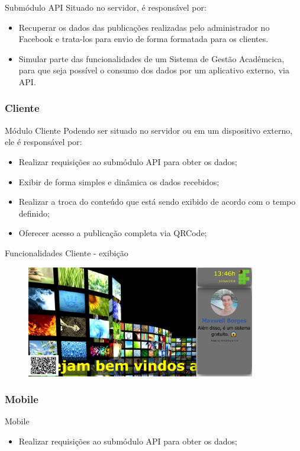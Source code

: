 \documentclass{aula-ifb}
\begin{document}
\begin{frame}{Submódulo API}
Situado no servidor, é responsável por:
\begin{itemize}
   \item Recuperar os dados das publicações realizadas pelo administrador no Facebook e trata-los para envio de forma formatada para os clientes. 
   \item Simular parte das funcionalidades de um Sistema de Gestão Acadêmcica, para que seja possível o consumo dos dados por um aplicativo externo, via API.
\end{itemize}
\end{frame}

\subsubsection{Cliente}
\begin{frame}{Módulo Cliente}
Podendo ser situado no servidor ou em um dispositivo externo, ele é responsável por:
\begin{itemize}
   \item Realizar requisições ao submódulo API para obter os dados;
   \item Exibir de forma simples e dinâmica os dados recebidos;
   \item Realizar a troca do conteúdo que está sendo exibido de acordo com o tempo definido;
   \item Oferecer acesso a publicação completa via QRCode;
\end{itemize}
\end{frame}
\begin{frame}{Funcionalidades Cliente - exibição}
\begin{figure}[h]
\includegraphics[width=10cm]{figuras/funcionalidadeexibir.png}
\label{fig:facebookgraph}
\end{figure}
\end{frame}

\subsubsection{Mobile}
\begin{frame}{Mobile}
\begin{itemize}
   \item Realizar requisições ao submódulo API para obter os dados;
\end{itemize}
\end{frame}
\end{document}
